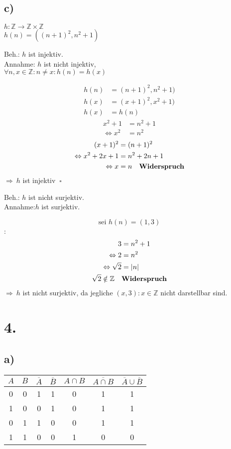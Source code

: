 \documentclass[a4paper]{scrartcl}
\newcommand{\qed}{\ \square}
\begin{document}
\subsection{c)}	
	\(h:\mathbb{Z}\rightarrow\mathbb{Z}\times\mathbb{Z}\)\\
	\(h(n)=((n+1)^2,n^2+1)\)
	\begin{flushleft}
		Beh.: \(h\) ist injektiv.\\
		Annahme: \(h\) ist nicht injektiv,\\
		\(\forall n,x\in\mathbb{Z}:n\neq x: h(n)=h(x)\)
	\end{flushleft}
	\begin{align}
		h(n)&= (n+1)^2,n^2+1)\\
		h(x)&= (x+1)^2,x^2+1)\\
		h(x)&=h(n)
	\end{align}
	\begin{align}
		x^2+1&=n^2+1\\
		\Leftrightarrow x^2&=n^2
	\end{align}
	\begin{align}
		(x+1)^2&=(n+1)^2 \\
		\Leftrightarrow x^2+2x+1&=n^2+2n+1\\
		\Leftrightarrow x&=n \quad \text{\textbf{Widerspruch}}
	\end{align}
	\(\Rightarrow\ h\) ist injektiv \(\qed\)
	\begin{flushleft}
		Beh.: \(h\) ist nicht surjektiv.\\
		Annahme:\(h\) ist surjektiv. 
	\end{flushleft}
	\[\text{sei } h(n)=(1,3)\]:	
	\begin{align}
		3&=n^2+1 \\
		\Leftrightarrow 2&=n^2 \\
		\Leftrightarrow \sqrt{2}&=|n| \\
		\sqrt{2}\notin\mathbb{Z}\quad &\text{\textbf{Widerspruch}} 
	\end{align}
	\(\Rightarrow\ h\) ist nicht surjektiv, da jegliche \((x,3):x\in\mathbb{Z}\) nicht darstellbar sind.
	
	
	
\section{4.}
\subsection{a)}
	\begin{tabular}{c|c||c|c|c|c|c}
		$A$ & $B$ & $\overline{A}$ & $\overline{B}$ & $A\cap B$ & $\overline{A\cap B}$ & 
		$\overline{A} \cup \overline{B}$\\ \hline
		0 & 0 & 1 & 1 & 0 & 1 & 1 \\
		1 & 0 & 0 & 1 & 0 & 1 & 1 \\
		0 & 1 & 1 & 0 & 0 & 1 & 1 \\
		1 & 1 & 0 & 0 & 1 & 0 & 0
	\end{tabular}
\end{document}
